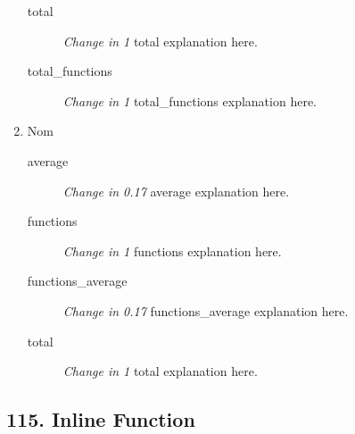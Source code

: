 \begin{enumerate}
        \begin{description}
          \item [total] \textit{Change in 1} total explanation here.
          \item [total\_functions] \textit{Change in 1} total\_functions explanation here.
        \end{description}
  \item Nom
        \begin{description}
          \item [average] \textit{Change in 0.17} average explanation here.
          \item [functions] \textit{Change in 1} functions explanation here.
          \item [functions\_average] \textit{Change in 0.17} functions\_average explanation here.
          \item [total] \textit{Change in 1} total explanation here.
        \end{description}
\end{enumerate}
\subsection{ 115.  Inline Function }

